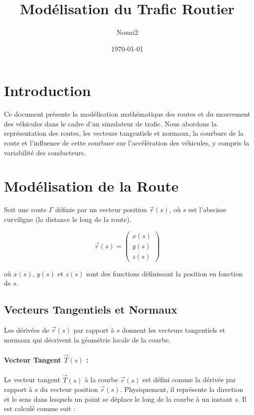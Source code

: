 \documentclass[a4paper,12pt]{article}
\title{Modélisation du Trafic Routier}
\author{Nouni2}
\date{\today}
\begin{document}
\maketitle

\section{Introduction}

Ce document présente la modélisation mathématique des routes et du mouvement des véhicules dans le cadre d'un simulateur de trafic. Nous abordons la représentation des routes, les vecteurs tangentiels et normaux, la courbure de la route et l'influence de cette courbure sur l'accélération des véhicules, y compris la variabilité des conducteurs.

\section{Modélisation de la Route}

Soit une route \(\Gamma\) définie par un vecteur position \(\vec{r}(s)\), où \(s\) est l'abscisse curviligne (la distance le long de la route).

\[
\vec{r}(s) = \begin{pmatrix}
x(s) \\
y(s) \\
z(s)
\end{pmatrix}
\]

où \(x(s)\), \(y(s)\) et \(z(s)\) sont des fonctions définissant la position en fonction de \(s\).

\subsection{Vecteurs Tangentiels et Normaux}

Les dérivées de \(\vec{r}(s)\) par rapport à \(s\) donnent les vecteurs tangentiels et normaux qui décrivent la géométrie locale de la courbe.

\paragraph{Vecteur Tangent \(\vec{T}(s)\) :}

Le vecteur tangent \(\vec{T}(s)\) à la courbe \(\vec{r}(s)\) est défini comme la dérivée par rapport à \(s\) du vecteur position \(\vec{r}(s)\). Physiquement, il représente la direction et le sens dans lesquels un point se déplace le long de la courbe à un instant \(s\). Il est calculé comme suit :
\end{document}
